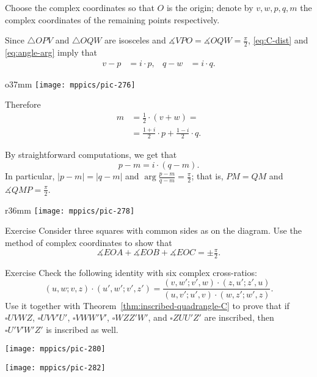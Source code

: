 Choose the complex coordinates so that $O$ is the origin;
denote by $v, w, p, q, m$ the complex coordinates of the remaining points respectively.

Since $\triangle OPV$ and $\triangle OQW$ are isosceles and $\measuredangle VPO=\measuredangle OQW=\tfrac\pi2$,
\ref{eq:C-dist} and \ref{eq:angle-arg} imply that
\begin{align*}
v-p&=i\cdot p,
&
q-w&=i\cdot q.
\end{align*}

\begin{wrapfigure}{o}{37mm}
\centering
\texttt{[image: mppics/pic-276]}
\end{wrapfigure}

Therefore
\begin{align*}
m
&=\tfrac12\cdot(v+w)=
\\
&=\tfrac{1+i}2\cdot p+\tfrac{1-i}2\cdot q.
\end{align*}

By straightforward computations, we get that
\[p-m=i\cdot (q-m).\]
In particular, $|p-m|=|q-m|$ and  $\arg\frac{p-m}{q-m}=\tfrac\pi2$;
that is, $PM=QM$ and $\measuredangle QMP =\tfrac\pi2$.  
\qeds

{

\begin{wrapfigure}{r}{36mm}
\vskip-4mm
\centering
\texttt{[image: mppics/pic-278]}
\end{wrapfigure}

\begin{thm}{Exercise}\label{ex:3-squares}
Consider three squares with common sides as on the diagram.
Use the method of complex coordinates to show that 
\[\measuredangle EOA+\measuredangle EOB+\measuredangle EOC=\pm\tfrac\pi2.\]

\end{thm}

}

\begin{thm}{Exercise}\label{ex:6-circles}
Check the following identity with six complex cross-ratios:
\[(u,w;v,z)\cdot(u',w';v',z')=\frac{(v,w';v',w)\cdot(z,u';z',u)}{(u,v';u',v)\cdot(w,z';w',z)}.\]
Use it together with Theorem~\ref{thm:inscribed-quadrangle-C} to prove that if
$\square UVWZ$, $\square UVV'U'$, $\square VWW'V'$, $\square WZZ'W'$, and $\square ZUU'Z'$
are inscribed, then  $\square U'V'W'Z'$ is inscribed as well.

\end{thm}

\begin{minipage}{.47\textwidth}
\centering
\texttt{[image: mppics/pic-280]}
\end{minipage}
\hfill
\begin{minipage}{.47\textwidth}
\centering
\texttt{[image: mppics/pic-282]}
\end{minipage}

